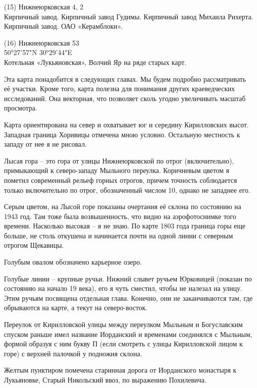 \begin{flushleft}
\medskip

(15) Нижнеюрковская 4, 2\\
Кирпичный завод. Кирпичный завод Гудимы. Кирпичный завод Михаила Рихерта. Кирпичный завод. ОАО «Керамблоки».\\

\medskip

(16) Нижнеюрковская 53\\
50°27'57"N 30°29'44"E\\
Котельная «Лукьяновская», Волчий Яр на ряде старых карт.
\end{flushleft}

Эта карта понадобится в следующих главах. Мы будем подробно рассматривать её участки. Кроме того, карта полезна для понимания других краеведческих исследований. Она векторная, что позволяет сколь угодно увеличивать масштаб просмотра. 

Карта ориентирована на север и охватывает юг и середину Кирилловских высот. Западная граница Хоривицы отмечена мною условно.  Остальную местность к западу от нее я не рисовал.

Лысая гора – это гора от улицы Нижнеюрковской по отрог (включительно), примыкающий к северо-западу Мыльного переулка. Коричневым цветом я пометил современный рельеф горных отрогов, причем точность соблюдается только включительно по отрог, обозначенный числом 10, однако не западнее его.

Серым цветом, на Лысой горе показаны очертания её склона по состоянию на 1943 год. Там тоже была возвышенность, что видно на аэрофотоснимке того времени. Насколько высокая – я не знаю. По карте 1803 года граница горы еще больше, не столь откушена и начинается почти на одной линии с северным отрогом Щекавицы.

Голубым овалом обозначено карьерное озеро.

Голубые линии – крупные ручьи. Нижний слывет ручьем Юрковицей (показан по состоянию на начало 19 века), его я чуть сместил, чтобы не налезал на улицу. Этим ручьям посвящена отдельная глава. Конечно, они не заканчиваются там, где обрываются на карте, а текут на северо-восток.
 
Переулок от Кирилловской улицы между переулком Мыльным и Богуславским спуском раньше имел название Иорданский и временами соединялся с Мыльным, формой образуя с ним букву П (если смотреть с улицы Кирилловской лицом к горе) с верхней палочкой у подножия склона.

Желтым пунктиром помечена старинная дорога от Иорданского монастыря к Лукьяновке, Старый Никольский ввоз, по выражению Похилевича.

